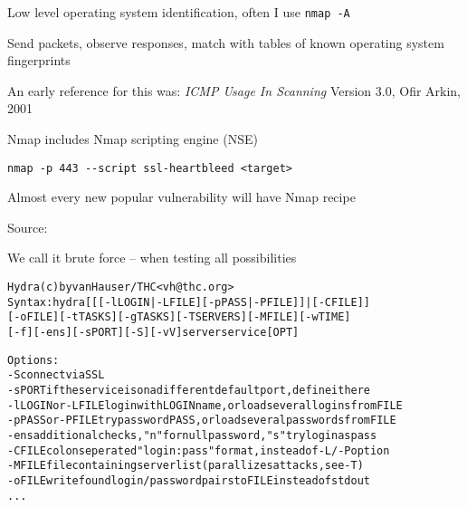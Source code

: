 \documentclass[Screen16to9,17pt]{foils}
\begin{document}
\begin{list2}
\item Low level operating system identification, often I use \verb+nmap -A+
\item Send packets, observe responses, match with tables of known operating system fingerprints
\item An early reference for this was: \emph{ICMP Usage In Scanning} Version 3.0,
  Ofir Arkin, 2001 %
\end{list2}



Nmap includes Nmap scripting engine (NSE)


\begin{list1}
\item \verb+nmap -p 443 --script ssl-heartbleed <target>+\\
\item Almost every new popular vulnerability will have Nmap recipe
\end{list1}





Source:




\begin{list1}
\item We call it brute force -- when testing all possibilities
\end{list1}

\begin{alltt}\small
Hydra (c) by van Hauser / THC <vh@thc.org>
Syntax: hydra [[[-l LOGIN|-L FILE] [-p PASS|-P FILE]] | [-C FILE]]
[-o FILE] [-t TASKS] [-g TASKS] [-T SERVERS] [-M FILE] [-w TIME]
[-f] [-e ns] [-s PORT] [-S] [-vV] server service [OPT]

Options:
  -S        connect via SSL
  -s PORT   if the service is on a different default port, define it here
  -l LOGIN  or -L FILE login with LOGIN name, or load several logins from FILE
  -p PASS   or -P FILE try password PASS, or load several passwords from FILE
  -e ns     additional checks, "n" for null password, "s" try login as pass
  -C FILE   colon seperated "login:pass" format, instead of -L/-P option
  -M FILE   file containing server list (parallizes attacks, see -T)
  -o FILE   write found login/password pairs to FILE instead of stdout
...
\end{alltt}
\end{document}
